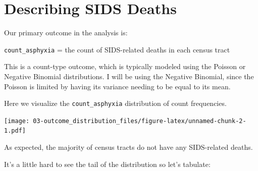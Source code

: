 \documentclass[
]{book}
\newenvironment{Shaded}{\begin{snugshade}}{\end{snugshade}}
\newcommand{\CommentTok}[1]{\textcolor[rgb]{0.56,0.35,0.01}{\textit{#1}}}
\newcommand{\DecValTok}[1]{\textcolor[rgb]{0.00,0.00,0.81}{#1}}
\newcommand{\FunctionTok}[1]{\textcolor[rgb]{0.00,0.00,0.00}{#1}}
\newcommand{\NormalTok}[1]{#1}
\newcommand{\SpecialCharTok}[1]{\textcolor[rgb]{0.00,0.00,0.00}{#1}}
\begin{document}
\hypertarget{describing-sids-deaths}{%
\chapter{Describing SIDS Deaths}\label{describing-sids-deaths}}

Our primary outcome in the analysis is:

\texttt{count\_asphyxia} = the count of SIDS-related deaths in each census tract

This is a count-type outcome, which is typically modeled using the Poisson or Negative Binomial distributions. I will be using the Negative Binomial, since the Poisson is limited by having its variance needing to be equal to its mean.

Here we visualize the \texttt{count\_asphyxia} distribution of count frequencies.

\begin{Shaded}
\end{Shaded}

\texttt{[image: 03-outcome\_distribution\_files/figure-latex/unnamed-chunk-2-1.pdf]}

As expected, the majority of census tracts do not have any SIDS-related deaths.

It's a little hard to see the tail of the distribution so let's tabulate:

\begin{Shaded}
\end{Shaded}


  
\end{document}
